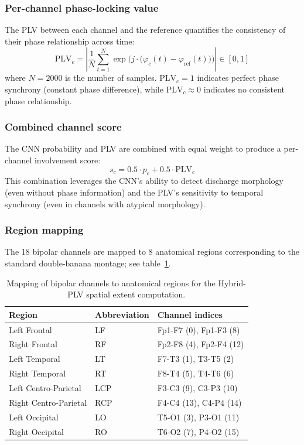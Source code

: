 \subsubsection{Per-channel phase-locking value}

The PLV between each channel and the reference quantifies the consistency of their phase relationship across time:
\[ \mathrm{PLV}_c = \left|\frac{1}{N} \sum_{t=1}^{N} \exp\!\Big(j \cdot \big(\varphi_c(t) - \varphi_{\mathrm{ref}}(t)\big)\Big)\right| \in [0, 1] \tag{7} \]
where $N = 2000$ is the number of samples. $\mathrm{PLV}_c = 1$ indicates perfect phase synchrony (constant phase difference), while $\mathrm{PLV}_c \approx 0$ indicates no consistent phase relationship.

\subsubsection{Combined channel score}

The CNN probability and PLV are combined with equal weight to produce a per-channel involvement score:
\[ s_c = 0.5 \cdot p_c + 0.5 \cdot \mathrm{PLV}_c \tag{8} \]
This combination leverages the CNN's ability to detect discharge morphology (even without phase information) and the PLV's sensitivity to temporal synchrony (even in channels with atypical morphology).

\subsubsection{Region mapping}

The 18 bipolar channels are mapped to 8 anatomical regions corresponding to the standard double-banana montage; see table~\ref{tab:hybrid_plv_regions}.

\begin{table}[h]
\centering
\caption{Mapping of bipolar channels to anatomical regions for the Hybrid-PLV spatial extent computation.}
\label{tab:hybrid_plv_regions}
\begin{tabular}{lll}
\hline
Region & Abbreviation & Channel indices \\
\hline
Left Frontal & LF & Fp1-F7 (0), Fp1-F3 (8) \\
Right Frontal & RF & Fp2-F8 (4), Fp2-F4 (12) \\
Left Temporal & LT & F7-T3 (1), T3-T5 (2) \\
Right Temporal & RT & F8-T4 (5), T4-T6 (6) \\
Left Centro-Parietal & LCP & F3-C3 (9), C3-P3 (10) \\
Right Centro-Parietal & RCP & F4-C4 (13), C4-P4 (14) \\
Left Occipital & LO & T5-O1 (3), P3-O1 (11) \\
Right Occipital & RO & T6-O2 (7), P4-O2 (15) \\
\hline
\end{tabular}
\end{table}


